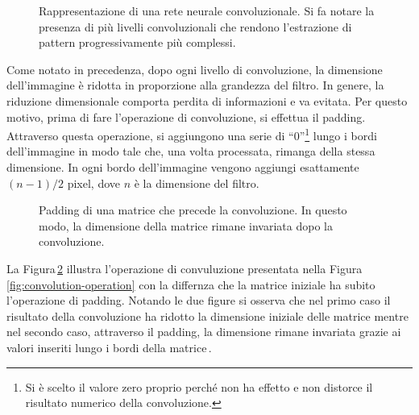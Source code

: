 % 
\begin{figure}[!t]
    \centering
    
    \caption[Rappresentazione di una rete neurale convoluzionale.]{Rappresentazione di una rete neurale convoluzionale. Si fa notare la presenza di più livelli convoluzionali che rendono l'estrazione di pattern progressivamente più complessi.}\label{fig:convolutional-neural-network}
\end{figure}

Come notato in precedenza, dopo ogni livello di convoluzione, la dimensione dell'immagine è ridotta in proporzione alla grandezza del filtro. In genere, la riduzione dimensionale comporta perdita di informazioni e va evitata. Per questo motivo, prima di fare l'operazione di convoluzione, si effettua il padding. Attraverso questa operazione, si aggiungono una serie di ``0''\footnote{Si è scelto il valore zero proprio perché non ha effetto e non distorce il risultato numerico della convoluzione.} lungo i bordi dell'immagine in modo tale che, una volta processata, rimanga della stessa dimensione. In ogni bordo dell'immagine vengono aggiungi esattamente $(n - 1) / 2$ pixel, dove $n$ è la dimensione del filtro. 
% 
\begin{figure}[!t]
    \centering
    
    \caption[Padding di una matrice che precede la convoluzione.]{Padding di una matrice che precede la convoluzione. In questo modo, la dimensione della matrice rimane invariata dopo la convoluzione.}\label{fig:padding}
\end{figure}
% 
La Figura\,\ref{fig:padding} illustra l'operazione di convuluzione presentata nella Figura\,\ref{fig:convolution-operation} con la differnza che la matrice iniziale ha subito l'operazione di padding. Notando le due figure si osserva che nel primo caso il risultato della convoluzione ha ridotto la dimensione iniziale delle matrice mentre nel secondo caso, attraverso il padding, la dimensione rimane invariata grazie ai valori inseriti lungo i bordi della matrice\,\cite{aggarwal2018neural}.

